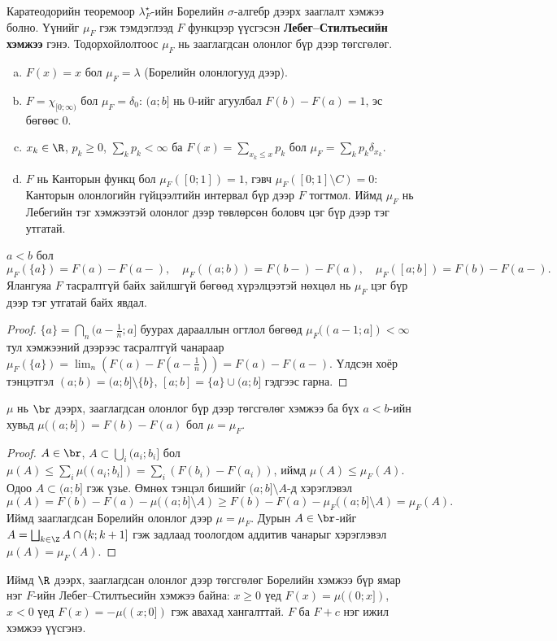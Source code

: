 Каратеодорийн теоремоор $\lambda_F^{\star}$-ийн Борелийн $\sigma$-алгебр дээрх зааглалт хэмжээ болно. Үүнийг $\mu_F$ гэж тэмдэглээд $F$ функцээр үүсгэсэн \textbf{Лебег--Стилтьесийн хэмжээ} гэнэ. Тодорхойлолтоос $\mu_F$ нь зааглагдсан олонлог бүр дээр төгсгөлөг.

\begin{exm}
\begin{enumerate}[a)]
\item $F(x)=x$ бол $\mu_F=\lambda$ (Борелийн олонлогууд дээр).
\item $F=\chi_{[0;\infty)}$ бол $\mu_F=\delta_0$: $(a;b]$ нь $0$-ийг агуулбал $F(b)-F(a)=1$, эс бөгөөс $0$.
\item $x_k\in\R$, $p_k\geq 0$, $\sum_kp_k\lt\infty$ ба $F(x)=\sum_{x_k\leq x}p_k$ бол $\mu_F=\sum_kp_k\delta_{x_k}$.
\item $F$ нь Канторын функц бол $\mu_F([0;1])=1$, гэвч $\mu_F([0;1]\setminus C)=0$: Канторын олонлогийн гүйцээлтийн интервал бүр дээр $F$ тогтмол. Иймд $\mu_F$ нь Лебегийн тэг хэмжээтэй олонлог дээр төвлөрсөн боловч цэг бүр дээр тэг утгатай.
\end{enumerate}
\end{exm}

\begin{prp}\label{lspoint}
$a\lt b$ бол
$$\mu_F(\{a\})=F(a)-F(a-),\quad \mu_F((a;b))=F(b-)-F(a),\quad \mu_F([a;b])=F(b)-F(a-).$$
Ялангуяа $F$ тасралтгүй байх зайлшгүй бөгөөд хүрэлцээтэй нөхцөл нь $\mu_F$ цэг бүр дээр тэг утгатай байх явдал.
\end{prp}
\begin{proof}
$\{a\}=\bigcap_n(a-\frac1n;a]$ буурах дарааллын огтлол бөгөөд $\mu_F((a-1;a])\lt\infty$ тул хэмжээний дээрээс тасралтгүй чанараар $\mu_F(\{a\})=\lim_n(F(a)-F(a-\frac1n))=F(a)-F(a-)$. Үлдсэн хоёр тэнцэтгэл $(a;b)=(a;b]\setminus\{b\}$, $[a;b]=\{a\}\cup(a;b]$ гэдгээс гарна.
\end{proof}

\begin{thm}\label{lsuniq}
$\mu$ нь $\br$ дээрх, зааглагдсан олонлог бүр дээр төгсгөлөг хэмжээ ба бүх $a\lt b$-ийн хувьд $\mu((a;b])=F(b)-F(a)$ бол $\mu=\mu_F$.
\end{thm}
\begin{proof}
$A\in\br$, $A\subset\bigcup_i(a_i;b_i]$ бол $\mu(A)\leq\sum_i\mu((a_i;b_i])=\sum_i(F(b_i)-F(a_i))$, иймд $\mu(A)\leq\mu_F(A)$. Одоо $A\subset(a;b]$ гэж үзье. Өмнөх тэнцэл бишийг $(a;b]\setminus A$-д хэрэглэвэл
$$\mu(A)=F(b)-F(a)-\mu((a;b]\setminus A)\geq F(b)-F(a)-\mu_F((a;b]\setminus A)=\mu_F(A).$$
Иймд зааглагдсан Борелийн олонлог дээр $\mu=\mu_F$. Дурын $A\in\br$-ийг $A=\bigsqcup_{k\in\Z}A\cap(k;k+1]$ гэж задлаад тоологдом аддитив чанарыг хэрэглэвэл $\mu(A)=\mu_F(A)$.
\end{proof}
Иймд $\R$ дээрх, зааглагдсан олонлог дээр төгсгөлөг Борелийн хэмжээ бүр ямар нэг $F$-ийн Лебег--Стилтьесийн хэмжээ байна: $x\geq 0$ үед $F(x)=\mu((0;x])$, $x\lt 0$ үед $F(x)=-\mu((x;0])$ гэж авахад хангалттай. $F$ ба $F+c$ нэг ижил хэмжээ үүсгэнэ.

